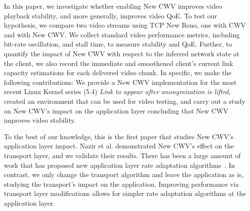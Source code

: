 \documentclass[10pt,sigconf,anonymous]{acmart}
\begin{document}
In this paper, we investigate whether enabling New CWV improves video playback stability, and more generally, improves video QoE. To test our hypothesis, we compare two video streams using TCP New Reno, one with CWV and with New CWV. We collect standard video performance metrics, including bit-rate oscillation, and stall time, to measure stability and QoE. Further, to quantify the impact of New CWV with respect to the inferred network state at the client, we also record the immediate and smoothened client's current link capacity estimations for each delivered video chunk.%
In specific, we make the following contributions: We provide a New CWV implementation for the most recent Linux Kernel series (5.4) \textit{Link to appear after anonymization is lifted}, created an environment that can be used for video testing, and carry out a study on New CWV's impact on the application layer concluding that New CWV improves video stability. 


To the best of our knowledge, this is the first paper that studies New CWV's application layer impact. Nazir et al. \cite{Nazir-2014-performance-evaluation-congestion-window-validation-dash-newcwv} demonstrated New CWV's effect on the transport layer, and we validate their results. There has been a large amount of work that has proposed new application layer rate adaptation algorithms~\cite{Mok-2012-qdash,Huang-2015-A-buffer-based-approach-to-rate-adaptation-bba, Yin-2015-a-control-theoritic-approach}. In contrast, we only change the transport algorithm and leave the application as is, studying the transport's impact on the application. Improving performance via transport layer modifications allows for simpler rate adaptation algorithms at the application layer. %

\end{document}
